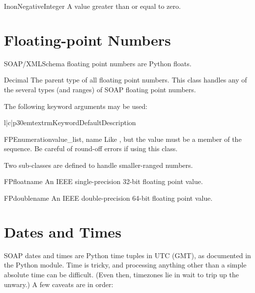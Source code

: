 \begin{classdesc}{InonNegativeInteger}{}
A value greater than or equal to zero.
\end{classdesc}

\section{Floating-point Numbers}

SOAP/XMLSchema floating point numbers are Python floats.

\begin{classdesc}{Decimal}{}
The parent type of all floating point numbers.
This class handles any of the several types (and ranges) of SOAP
floating point numbers.

The following keyword arguments may be used:

\begin{tableiii}{l|c|p{30em}}{textrm}{Keyword}{Default}{Description}
\end{tableiii}
\end{classdesc}

\begin{classdesc}{FPEnumeration}{value_list, name}
Like , but the value must be a member of
the  sequence.
Be careful of round-off errors if using this class.
\end{classdesc}

Two sub-classes are defined to handle smaller-ranged numbers.

\begin{classdesc}{FPfloat}{name}
An IEEE single-precision 32-bit floating point value.
\end{classdesc}

\begin{classdesc}{FPdouble}{name}
An IEEE double-precision 64-bit floating point value.
\end{classdesc}

\section{Dates and Times}

SOAP dates and times are Python time tuples in UTC (GMT), as documented
in the Python  module.
Time is tricky, and processing anything other than a simple absolute time
can be difficult.
(Even then, timezones lie in wait to trip up the unwary.)
A few caveats are in order:

